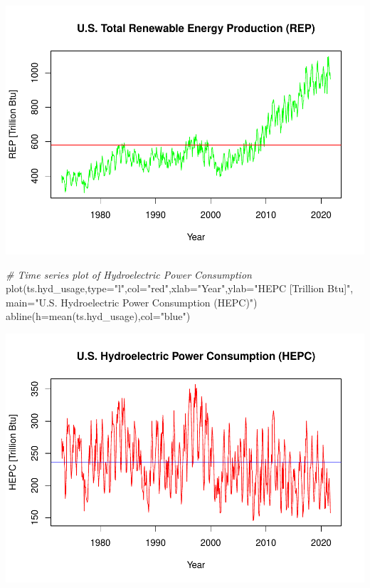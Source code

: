\documentclass[
]{article}
\newenvironment{Shaded}{\begin{snugshade}}{\end{snugshade}}
\newcommand{\AttributeTok}[1]{\textcolor[rgb]{0.77,0.63,0.00}{#1}}
\newcommand{\CommentTok}[1]{\textcolor[rgb]{0.56,0.35,0.01}{\textit{#1}}}
\newcommand{\FunctionTok}[1]{\textcolor[rgb]{0.00,0.00,0.00}{#1}}
\newcommand{\NormalTok}[1]{#1}
\newcommand{\StringTok}[1]{\textcolor[rgb]{0.31,0.60,0.02}{#1}}
\begin{document}
\includegraphics{YaredAsfaw_TSA_A02_Sp22_files/figure-latex/unnamed-chunk-12-1.pdf}

\begin{Shaded}
\begin{Highlighting}[]
\CommentTok{\# Time series plot of Hydroelectric Power Consumption}
\FunctionTok{plot}\NormalTok{(ts.hyd\_usage,}\AttributeTok{type=}\StringTok{"l"}\NormalTok{,}\AttributeTok{col=}\StringTok{"red"}\NormalTok{,}\AttributeTok{xlab=}\StringTok{"Year"}\NormalTok{,}\AttributeTok{ylab=}\StringTok{"HEPC [Trillion Btu]"}\NormalTok{,}
\AttributeTok{main=}\StringTok{"U.S. Hydroelectric Power Consumption (HEPC)"}\NormalTok{)}
\FunctionTok{abline}\NormalTok{(}\AttributeTok{h=}\FunctionTok{mean}\NormalTok{(ts.hyd\_usage),}\AttributeTok{col=}\StringTok{"blue"}\NormalTok{)}
\end{Highlighting}
\end{Shaded}

\includegraphics{YaredAsfaw_TSA_A02_Sp22_files/figure-latex/unnamed-chunk-13-1.pdf}
\end{document}
